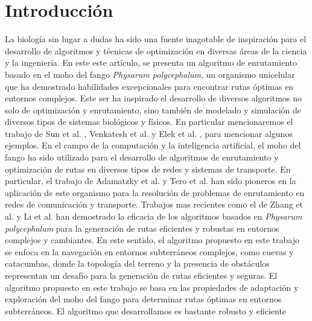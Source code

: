 \section{Introducci\'on}
\label{sec:introduccion}
        La biolog\'ia sin lugar a dudas ha sido una fuente inagotable de inspiraci\'on para el desarrollo de algoritmos
            y t\'ecnicas de optimizaci\'on en diversas \'areas de la ciencia y la ingenier\'ia. En este este art\'iculo,
            se presenta un algoritmo de enrutamiento basado en el moho del fango \textit{Physarum polycephalum}, un organismo
            unicelular que ha demostrado habilidades excepcionales para encontrar rutas \'optimas en entornos complejos.
            Este ser ha inspirado el desarrollo de diversos algoritmos no solo de optimizaci\'on y enrutamiento, sino tambi\'en
            de modelado y simulaci\'on de diversos tipos de sistemas biol\'ogicos y f\'isicos. En particular mencionaremos 
            el trabajo de Sun et al. \cite{sun2011}, Venkatesh et al. \cite{venkatesh2018} y Elek et al. \cite{elek2019}, para 
            mencionar algunos ejemplos.
    \vskip 0.5cm
        En el campo de la computaci\'on y la inteligencia artificial, el moho del fango ha sido utilizado para el desarrollo
            de algoritmos de enrutamiento y optimizaci\'on de rutas en diversos tipos de redes y sistemas de transporte. 
            En particular, el trabajo de Adamatzky et al. \cite{adamatzky2010} y Tero et al. \cite{tero2010} han sido pioneros
            en la aplicaci\'on de este organismo para la resoluci\'on de problemas de enrutamiento en redes de comunicaci\'on y
            transporte. Trabajos mas recientes como el de Zhang et al. \cite{zhang2019} y Li et al. \cite{li2020} han demostrado
            la eficacia de los algoritmos basados en \textit{Physarum polycephalum} para la generaci\'on de rutas eficientes y
            robustas en entornos complejos y cambiantes. En este sentido, el algoritmo propuesto en este trabajo se enfoca en la navegaci\'on 
            en entornos subterr\'aneos complejos, como cuevas y catacumbas, donde la topolog\'ia del terreno y la presencia de obst\'aculos representan un desaf\'io
            para la generaci\'on de rutas eficientes y seguras.
    \vskip 0.5cm
        El algoritmo propuesto en este trabajo se basa en las propiedades de adaptaci\'on y exploraci\'on del moho del fango
            para determinar rutas \'optimas en entornos subterr\'aneos. El algoritmo que desarrollamos es bastante robusto y eficiente
